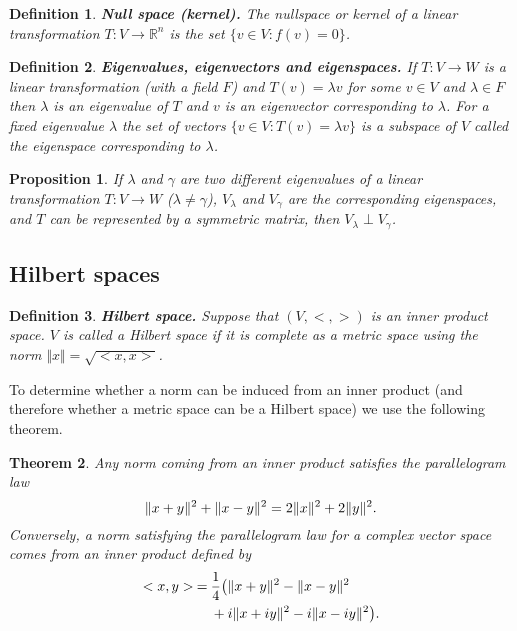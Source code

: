 \documentclass[two column]{article}
\newtheorem{theorem}{Theorem}[subsection]
\newtheorem{proposition}[theorem]{Proposition}
\newtheorem{definition}{Definition}[subsection]
\begin{document}
\begin{definition}
{\bf Null space (kernel).} The nullspace or kernel of a linear transformation $T : V \rightarrow \mathbb{R}^{n}$ is the set $\{ v \in V: f(v) = 0\}$. \\
\end{definition}

\begin{definition}
{\bf Eigenvalues, eigenvectors and eigenspaces.} If $T:V \rightarrow W$ is a linear transformation (with a field $F$) and $T(v) = \lambda v$ for some $v \in V$ and $\lambda \in F$ then $\lambda$ is an \emph{eigenvalue} of $T$ and $v$ is an \emph{eigenvector} corresponding to $\lambda$. For a fixed eigenvalue $\lambda$ the set of vectors $\{ v \in V : T(v) = \lambda v \}$ is a subspace of $V$ called the \emph{eigenspace} corresponding to $\lambda$. \\
\end{definition}

\begin{proposition}
If $\lambda$ and $\gamma$ are two different eigenvalues of a linear transformation $T : V \rightarrow W$ ($\lambda \neq \gamma$), $V_{\lambda}$ and $V_{\gamma}$ are the corresponding eigenspaces, and $T$ can be represented by a symmetric matrix, then $V_{\lambda} \perp V_{\gamma}$.
\end{proposition}

\subsection{Hilbert spaces}

\begin{definition}
{\bf Hilbert space.} Suppose that $(V, <,>)$ is an inner product space. $V$ is called a Hilbert space if it is complete as a metric space using the norm $\Vert x \Vert = \sqrt{<x,x>}$. \\
\end{definition}

To determine whether a norm can be induced from an inner product (and therefore whether a metric space can be a Hilbert space) we use the following theorem.\\

\begin{theorem}
Any norm coming from an inner product satisfies the parallelogram law \vspace{-5pt}
\[
\Vert x + y \Vert^{2} + \Vert x - y \Vert^{2} = 2\Vert x \Vert^{2} + 2 \Vert y \Vert^{2}. \vspace{-5pt}
\]
Conversely, a norm satisfying the parallelogram law for a complex vector space comes from an inner product defined by \vspace{-10pt}
\begin{align*}
< x,y > \: = \: &\frac{1}{4} \big( \Vert x + y \Vert^{2} - \Vert x - y \Vert^{2} \\
&+ i\Vert x + iy \Vert^{2} - i\Vert x - iy \Vert^{2} \big). \vspace{-5pt}
\end{align*} 
\end{theorem}
\end{document}
